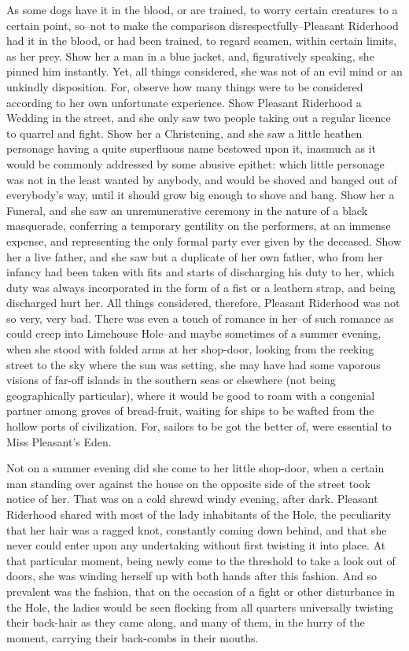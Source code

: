 As some dogs have it in the blood, or are trained, to worry certain
creatures to a certain point, so--not to make the comparison
disrespectfully--Pleasant Riderhood had it in the blood, or had been
trained, to regard seamen, within certain limits, as her prey. Show
her a man in a blue jacket, and, figuratively speaking, she pinned him
instantly. Yet, all things considered, she was not of an evil mind or an
unkindly disposition. For, observe how many things were to be considered
according to her own unfortunate experience. Show Pleasant Riderhood a
Wedding in the street, and she only saw two people taking out a regular
licence to quarrel and fight. Show her a Christening, and she saw a
little heathen personage having a quite superfluous name bestowed upon
it, inasmuch as it would be commonly addressed by some abusive epithet:
which little personage was not in the least wanted by anybody, and would
be shoved and banged out of everybody’s way, until it should grow
big enough to shove and bang. Show her a Funeral, and she saw an
unremunerative ceremony in the nature of a black masquerade, conferring
a temporary gentility on the performers, at an immense expense, and
representing the only formal party ever given by the deceased. Show her
a live father, and she saw but a duplicate of her own father, who from
her infancy had been taken with fits and starts of discharging his duty
to her, which duty was always incorporated in the form of a fist or a
leathern strap, and being discharged hurt her. All things considered,
therefore, Pleasant Riderhood was not so very, very bad. There was even
a touch of romance in her--of such romance as could creep into Limehouse
Hole--and maybe sometimes of a summer evening, when she stood with
folded arms at her shop-door, looking from the reeking street to the
sky where the sun was setting, she may have had some vaporous visions
of far-off islands in the southern seas or elsewhere (not being
geographically particular), where it would be good to roam with a
congenial partner among groves of bread-fruit, waiting for ships to be
wafted from the hollow ports of civilization. For, sailors to be got the
better of, were essential to Miss Pleasant’s Eden.

Not on a summer evening did she come to her little shop-door, when a
certain man standing over against the house on the opposite side of
the street took notice of her. That was on a cold shrewd windy evening,
after dark. Pleasant Riderhood shared with most of the lady inhabitants
of the Hole, the peculiarity that her hair was a ragged knot, constantly
coming down behind, and that she never could enter upon any undertaking
without first twisting it into place. At that particular moment, being
newly come to the threshold to take a look out of doors, she was winding
herself up with both hands after this fashion. And so prevalent was the
fashion, that on the occasion of a fight or other disturbance in the
Hole, the ladies would be seen flocking from all quarters universally
twisting their back-hair as they came along, and many of them, in the
hurry of the moment, carrying their back-combs in their mouths.

